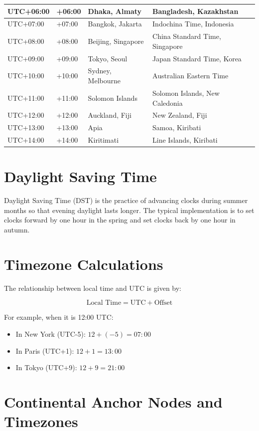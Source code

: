 \documentclass[12pt]{article}
\begin{document}
\begin{longtable}{|p{3cm}|p{2cm}|p{3cm}|p{5cm}|}
\hline
UTC+06:00 & +06:00 & Dhaka, Almaty & Bangladesh, Kazakhstan \\
\hline
UTC+07:00 & +07:00 & Bangkok, Jakarta & Indochina Time, Indonesia \\
\hline
UTC+08:00 & +08:00 & Beijing, Singapore & China Standard Time, Singapore \\
\hline
UTC+09:00 & +09:00 & Tokyo, Seoul & Japan Standard Time, Korea \\
\hline
UTC+10:00 & +10:00 & Sydney, Melbourne & Australian Eastern Time \\
\hline
UTC+11:00 & +11:00 & Solomon Islands & Solomon Islands, New Caledonia \\
\hline
UTC+12:00 & +12:00 & Auckland, Fiji & New Zealand, Fiji \\
\hline
UTC+13:00 & +13:00 & Apia & Samoa, Kiribati \\
\hline
UTC+14:00 & +14:00 & Kiritimati & Line Islands, Kiribati \\
\hline
\end{longtable}

\section{Daylight Saving Time}

Daylight Saving Time (DST) is the practice of advancing clocks during summer months so that evening daylight lasts longer. The typical implementation is to set clocks forward by one hour in the spring and set clocks back by one hour in autumn.

\section{Timezone Calculations}

The relationship between local time and UTC is given by:

\begin{equation}
\text{Local Time} = \text{UTC} + \text{Offset}
\end{equation}

For example, when it is 12:00 UTC:
\begin{itemize}
\item In New York (UTC-5): $12 + (-5) = 07:00$
\item In Paris (UTC+1): $12 + 1 = 13:00$
\item In Tokyo (UTC+9): $12 + 9 = 21:00$
\end{itemize}

\section{Continental Anchor Nodes and Timezones}
\end{document}
